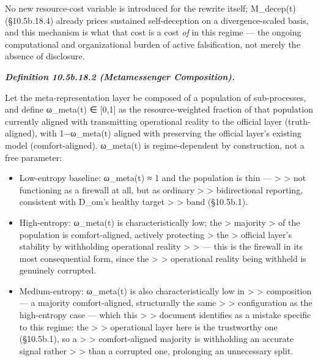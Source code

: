 \documentclass[
]{article}
\begin{document}
No new resource-cost variable is introduced for the rewrite itself;
M\_decep(t) (§10.5b.18.4) already prices sustained self-deception on a
divergence-scaled basis, and this mechanism is what that cost is a cost
\emph{of} in this regime --- the ongoing computational and
organizational burden of active falsification, not merely the absence of
disclosure.

\emph{\textbf{Definition 10.5b.18.2 (Metamessenger Composition).}}

Let the meta-representation layer be composed of a population of
sub-processes, and define ω\_meta(t) ∈ {[}0,1{]} as the
resource-weighted fraction of that population currently aligned with
transmitting operational reality to the official layer (truth-aligned),
with 1−ω\_meta(t) aligned with preserving the official layer's existing
model (comfort-aligned). ω\_meta(t) is regime-dependent by construction,
not a free parameter:

\begin{itemize}
\item
  Low-entropy baseline: ω\_meta(t) ≈ 1 and the population is thin ---
  \textgreater{} \textgreater{} not functioning as a firewall at all,
  but as ordinary \textgreater{} \textgreater{} bidirectional reporting,
  consistent with D\_om's healthy target \textgreater{} \textgreater{}
  band (§10.5b.1).
\item
  High-entropy: ω\_meta(t) is characteristically low; the \textgreater{}
  majority \textgreater{} of the population is comfort-aligned, actively
  protecting \textgreater{} the \textgreater{} official layer's
  stability by withholding operational reality \textgreater{}
  \textgreater{} --- this is the firewall in its most consequential
  form, since the \textgreater{} \textgreater{} operational reality
  being withheld is genuinely corrupted.
\item
  Medium-entropy: ω\_meta(t) is also characteristically low in
  \textgreater{} \textgreater{} composition --- a majority
  comfort-aligned, structurally the same \textgreater{} \textgreater{}
  configuration as the high-entropy case --- which this \textgreater{}
  \textgreater{} document identifies as a mistake specific to this
  regime: the \textgreater{} \textgreater{} operational layer here is
  the trustworthy one (§10.5b.1), so a \textgreater{} \textgreater{}
  comfort-aligned majority is withholding an accurate signal rather
  \textgreater{} \textgreater{} than a corrupted one, prolonging an
  unnecessary split.
\end{itemize}
\end{document}
